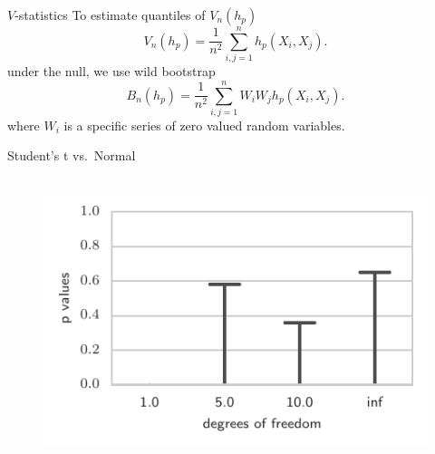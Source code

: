 \documentclass{beamer}
\begin{document}
 
  \begin{frame}{$V$-statistics}
To estimate quantiles of $ V_n(h_p)$  
\[
 V_n(h_p) = \frac {1} {n^2} \sum_{i,j=1}^n h_p(X_i,X_j).
\]
under the null, we use wild bootstrap
\[
 B_n(h_p) = \frac {1} {n^2} \sum_{i,j=1}^n W_i W_j h_p(X_i,X_j).
\]
  where $W_i$ is a specific series of zero valued random variables.
\end{frame}

  \begin{frame}{Student's t vs.~Normal}
\begin{columns}
        \begin{column}{.5\textwidth}
        \begin{figure}
           \includegraphics[width=\textwidth]{img/sgld_student_bad} 
           

\end{figure}
\end{column}
\end{columns}
\end{frame}
\end{document}
